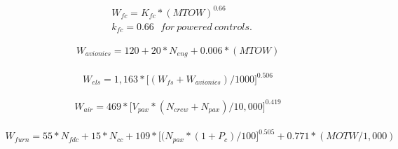 \documentclass[11pt]{article}
\begin{document}
\begin{equation} \label{eq:fc} %
\begin{split} 
&W_{fc} = K_{fc}*(MTOW)^{0.66} \\
&k_{fc} = 0.66 \ \ \ for \ powered \ controls.
\end{split}
\end{equation}



\begin{equation} \label{eq:avionics} %
\begin{split} 
W_{avionics} = 120 + 20*N_{eng} + 0.006*(MTOW)
\end{split}
\end{equation}

\begin{equation} \label{eq:els} %
\begin{split} 
W_{els} = 1,163*\Big[(W_{fs} + W_{avionics})/1000\Big]^{0.506}
\end{split}
\end{equation}

\begin{equation} \label{eq:air} %
\begin{split} 
W_{air} = 469* \Big[V_{pax} * (N_{crew} + N_{pax}) / 10,000 \Big]^{0.419}
\end{split}
\end{equation}

\begin{equation} \label{eq:furn} %
\begin{split} 
W_{furn} = 55*N_{fdc} + 15*N_{cc} + 109*\Big[(N_{pax}*(1 + P_{c})/100\Big]^{0.505} + 0.771*(MOTW/1,000)
\end{split}
\end{equation}
\end{document}
